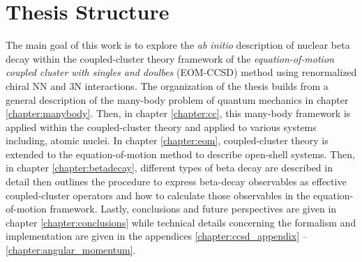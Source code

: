 \documentclass[../thesis.tex]{subfiles}
\begin{document}
\section{Thesis Structure}

The main goal of this work is to explore the \emph{ab initio} description of nuclear beta decay within the coupled-cluster theory framework of the \textit{equation-of-motion coupled cluster with singles and doulbes} (EOM-CCSD) method using renormalized chiral NN and 3N interactions.  The organization of the thesis builds from a general description of the many-body problem of quantum mechanics in chapter \ref{chapter:manybody}. Then, in chapter \ref{chapter:cc}, this many-body framework is applied within the coupled-cluster theory and applied to various systems including, atomic nuclei. In chapter \ref{chapter:eom}, coupled-cluster theory is extended to the equation-of-motion method to describe open-shell systems.  Then, in chapter \ref{chapter:betadecay}, different types of beta decay are described in detail then outlines the procedure to express beta-decay observables as effective coupled-cluster operators and how to calculate those observables in the equation-of-motion framework.  Lastly, conclusions and future perspectives are given in chapter \ref{chapter:conclusions} while technical details concerning the formalism and implementation are given in the appendices \ref{chapter:ccsd_appendix} -- \ref{chapter:angular_momentum}.
\end{document}
